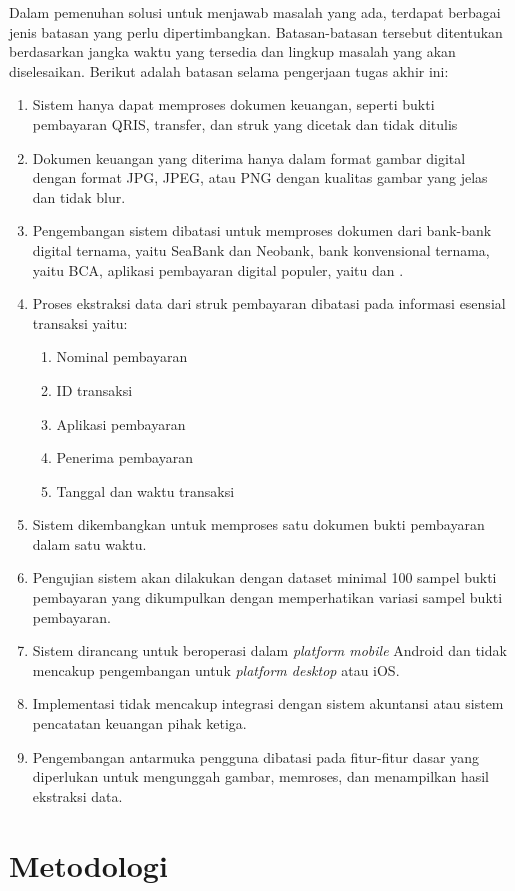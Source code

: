 Dalam pemenuhan solusi untuk menjawab masalah yang ada, terdapat berbagai jenis batasan yang perlu dipertimbangkan. Batasan-batasan tersebut ditentukan berdasarkan jangka waktu yang tersedia dan lingkup masalah yang akan diselesaikan. Berikut adalah batasan selama pengerjaan tugas akhir ini:
\begin{enumerate}
	\item Sistem hanya dapat memproses dokumen keuangan, seperti bukti pembayaran QRIS, transfer, dan struk yang dicetak dan tidak ditulis
	\item Dokumen keuangan yang diterima hanya dalam format gambar digital dengan format JPG, JPEG, atau PNG dengan kualitas gambar yang jelas dan tidak blur.
	\item  Pengembangan sistem dibatasi untuk memproses dokumen dari bank-bank digital ternama, yaitu SeaBank dan Neobank, bank konvensional ternama, yaitu BCA, aplikasi pembayaran digital populer, yaitu dan \gopay{}.
	\item  Proses ekstraksi data dari struk pembayaran dibatasi pada informasi esensial transaksi yaitu:
	      \begin{enumerate}
		      \item Nominal pembayaran
		      \item ID transaksi
		      \item Aplikasi pembayaran
		      \item Penerima pembayaran
		      \item Tanggal dan waktu transaksi
	      \end{enumerate}
	\item Sistem dikembangkan untuk memproses satu dokumen bukti pembayaran dalam satu waktu.
	\item Pengujian sistem akan dilakukan dengan dataset minimal 100 sampel bukti pembayaran yang dikumpulkan dengan memperhatikan variasi sampel bukti pembayaran.
	\item Sistem dirancang untuk beroperasi dalam \emph{platform mobile} Android dan tidak mencakup pengembangan untuk \emph{platform desktop} atau iOS.
	\item Implementasi tidak mencakup integrasi dengan sistem akuntansi atau sistem pencatatan keuangan pihak ketiga.
	\item Pengembangan antarmuka pengguna dibatasi pada fitur-fitur dasar yang diperlukan untuk mengunggah gambar, memroses, dan menampilkan hasil ekstraksi data.
\end{enumerate}

\section{Metodologi}
\label{sec:metodologi}

